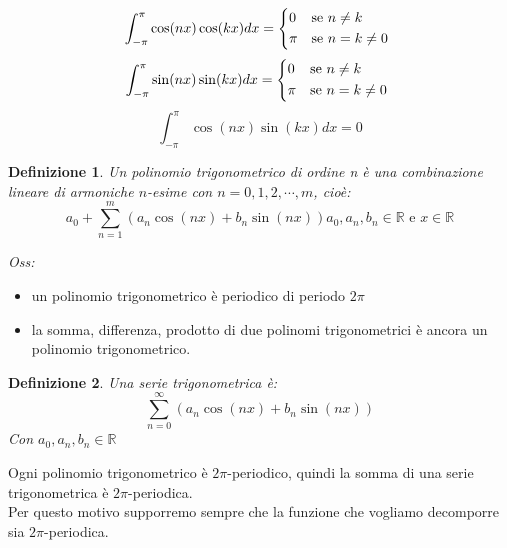 \documentclass{scrreprt}
\newtheorem{defn}{Definizione}
\newenvironment{definition}{\begin{mdframed}[backgroundcolor=Ivory2]\begin{defn}}{\end{defn}\end{mdframed}}
\begin{document}
\begin{equation}
	\int_{-\pi}^\pi \cos(nx)\cos(kx)dx =
		\begin{cases*}
			0 	& se  $n\neq k$\\
			\pi & se  $n=k\neq 0$
		\end{cases*}
\end{equation}
\begin{equation}
	\int_{-\pi}^\pi \sin(nx)\sin(kx)dx =
		\begin{cases*}
			0 	& se $n\neq k$\\
			\pi & se $ n=k\neq 0$
		\end{cases*}
\end{equation}
\begin{equation}
	\int_{-\pi}^\pi \cos(nx)\sin(kx)dx = 0
\end{equation}


\begin{definition}
	Un polinomio trigonometrico di ordine n è una combinazione lineare di  armoniche $n$-esime con $n=0,1,2,\cdots,m$, cioè:
	\begin{equation}
		a_0 + \sum_{n=1}^m \left(a_n \cos(nx) + b_n \sin(nx)\right)
		a_0, a_n, b_n \in \mathbb{R} \text{ e } x\in\mathbb{R}
	\end{equation}
\end{definition}
\emph{Oss:}
\begin{itemize}
	\item un polinomio trigonometrico è periodico di periodo $2\pi$
	\item la somma, differenza, prodotto di due polinomi trigonometrici è ancora un polinomio trigonometrico.
\end{itemize}

\begin{definition}
	Una serie trigonometrica è:
	\begin{equation}
		\sum_{n=0}^\infty \left(a_n \cos(nx) + b_n \sin(nx)\right)
	\end{equation}
	Con $a_0,a_n,b_n\in\mathbb{R}$
\end{definition}

Ogni polinomio trigonometrico è $2\pi$-periodico, quindi la somma di una serie trigonometrica è $2\pi$-periodica.\\
Per questo motivo supporremo sempre che la funzione che vogliamo decomporre sia $2\pi$-periodica.\\

\end{document}
